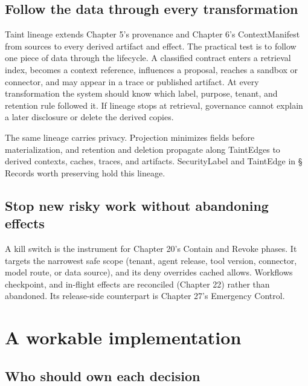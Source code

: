 \subsection{Follow the data through every transformation}

Taint lineage extends Chapter 5's provenance and Chapter 6's ContextManifest from sources to every derived artifact and effect. The practical test is to follow one piece of data through the lifecycle. A classified contract enters a retrieval index, becomes a context reference, influences a proposal, reaches a sandbox or connector, and may appear in a trace or published artifact. At every transformation the system should know which label, purpose, tenant, and retention rule followed it. If lineage stops at retrieval, governance cannot explain a later disclosure or delete the derived copies.\par

The same lineage carries privacy. Projection minimizes fields before materialization, and retention and deletion propagate along TaintEdges to derived contexts, caches, traces, and artifacts. SecurityLabel and TaintEdge in § Records worth preserving hold this lineage.\par

\subsection{Stop new risky work without abandoning effects}

A kill switch is the instrument for Chapter 20's Contain and Revoke phases. It targets the narrowest safe scope (tenant, agent release, tool version, connector, model route, or data source), and its deny overrides cached allows. Workflows checkpoint, and in-flight effects are reconciled (Chapter 22) rather than abandoned. Its release-side counterpart is Chapter 27's Emergency Control.\par

\section{A workable implementation}

\subsection{Who should own each decision}

